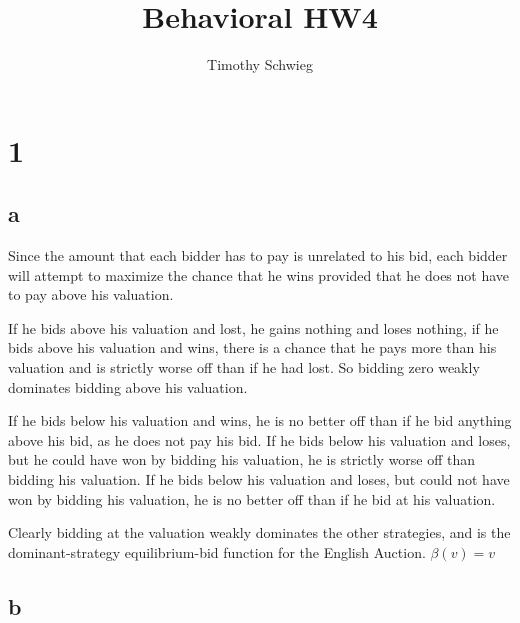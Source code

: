 \documentclass[10pt]{paper}
\title{Behavioral HW4}
\author{Timothy Schwieg}
\begin{document}
\maketitle

\section*{1}
\subsection*{a}

Since the amount that each bidder has to pay is unrelated to his bid,
each bidder will attempt to maximize the chance that he wins provided
that he does not have to pay above his valuation.

If he bids above his valuation and lost, he gains nothing and loses
nothing, if he bids above his valuation and wins, there is a chance
that he pays more than his valuation and is strictly worse off than if
he had lost. So bidding zero weakly dominates bidding above his
valuation.

If he bids below his valuation and wins, he is no better off than if
he bid anything above his bid, as he does not pay his bid. If he bids
below his valuation and loses, but he could have won by bidding his
valuation, he is strictly worse off than bidding his valuation. If he
bids below his valuation and loses, but could not have won by bidding
his valuation, he is no better off than if he bid at his valuation.

Clearly bidding at the valuation weakly dominates the other
strategies, and is the dominant-strategy equilibrium-bid function
for the English Auction. $\beta(v) = v$

\subsection*{b}
\end{document}
